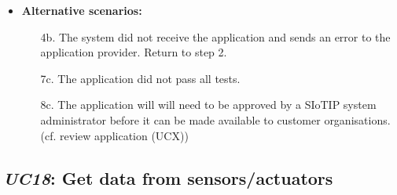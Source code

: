 \begin{itemize}
    \item \textbf{Alternative scenarios:}
    \begin{enumerate}
        \item [4b.] The system did not receive the application and sends an error
                    to the application provider. Return to step 2.
        \item [7c.] The application did not pass all tests.
        \item [8c.] The application will will need to be approved by a SIoTIP
                    system administrator before it can be made available to
                    customer organisations. (cf. review application (UCX))
    \end{enumerate}
\end{itemize}

\subsection{\emph{UC18}: Get data from sensors/actuators}
